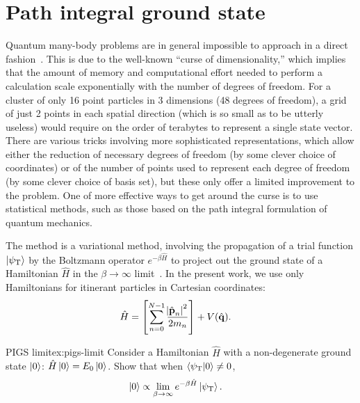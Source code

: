 \section{Path integral ground state}

Quantum many-body problems are in general impossible to approach in a direct fashion~\cite[391-392]{tuckerman2010statistical}.
This is due to the well-known ``curse of dimensionality,'' which implies that the amount of memory and computational effort needed to perform a calculation scale exponentially with the number of degrees of freedom.
For a cluster of only 16 point particles in 3 dimensions (48 degrees of freedom), a grid of just 2 points in each spatial direction (which is so small as to be utterly useless) would require on the order of terabytes to represent a single state vector.
There are various tricks involving more sophisticated representations, which allow either the reduction of necessary degrees of freedom (by some clever choice of coordinates) or of the number of points used to represent each degree of freedom (by some clever choice of basis set), but these only offer a limited improvement to the problem.
One of more effective ways to get around the curse is to use statistical methods, such as those based on the path integral formulation of quantum mechanics.

The  method is a variational method, involving the propagation of a trial function $\ket{\psi_\mathrm{T}}$ by the Boltzmann operator $e^{-\beta \hat{H}}$ to project out the ground state of a Hamiltonian $\hat{H}$ in the $\beta \to \infty$ limit~\cite{sarsa2000pigs}.
In the present work, we use only Hamiltonians for itinerant particles in Cartesian coordinates:
\begin{align}
	\hat{H}
	&= \left[ \sum_{n=0}^{N-1} \frac{\abs{\hat{\bm{\mathbf{p}}}_n}^2}{2 m_n} \right]
		+ V(\hat{\bm{\mathbf{q}}}).
\end{align}

\begin{DefExercise}{PIGS limit}{ex:pigs-limit}
	Consider a Hamiltonian $\hat{H}$ with a non-degenerate ground state $\ket{0}$: $\hat{H} \ket{0} = E_0 \ket{0}$.
	Show that when $\braket{\psi_\mathrm{T} | 0} \ne 0$,
	\begin{align}
		\ket{0}
		&\propto \lim_{\beta \to \infty} e^{-\beta \hat{H}} \ket{\psi_\mathrm{T}}.
	\end{align}
\end{DefExercise}


